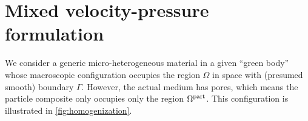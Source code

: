 \documentclass[MikaelDissertation.tex]{subfiles}
\begin{document}
\section{Mixed velocity-pressure formulation}
We consider a generic micro-heterogeneous material in a given ``green body'' whose macroscopic configuration occupies the region $\Omega$ in space with (presumed smooth) boundary $\Gamma$.
However, the actual medium has pores, which means the particle composite only occupies only the region $\Omega^{\mathrm{part}}$.
This configuration is illustrated in \cref{fig:homogenization}.
\end{document}
